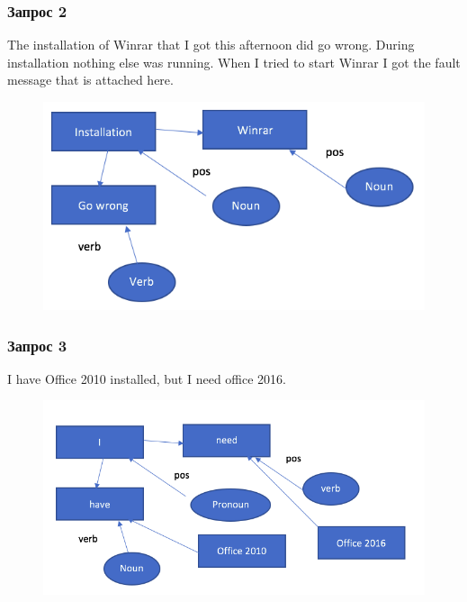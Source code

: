 \documentclass[14pt]{beamer}
\begin{document}
\begin{frame}
\frametitle{Запрос 2}
The installation of Winrar that I got this afternoon did go wrong. During installation nothing else was running. When I tried to start Winrar I got the fault message that is attached here.
\begin{figure} [h] 
  \center
  \includegraphics [scale=0.5] {Request2}
  \label{img:Request2}  
\end{figure}
\end{frame}


\begin{frame}
\frametitle{Запрос 3}
I have Office 2010 installed, but I need office 2016.
\begin{figure} [h] 
  \center
  \includegraphics [scale=0.5] {Request3}
  \label{img:Request3}  
\end{figure}
\end{frame}
\end{document}
